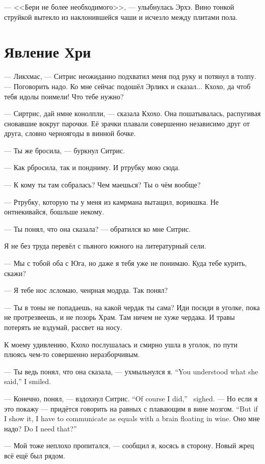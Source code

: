 --- <<Бери не более необходимого>>, --- улыбнулась Эрхэ.
Вино тонкой струйкой вытекло из наклонившейся чаши и исчезло между плитами пола.

\section{Явление Хри}

--- Ликхмас, --- Ситрис неожиданно подхватил меня под руку и потянул в толпу.
--- Поговорить надо.
Ко мне сейчас подошёл Эрликх и сказал...
Кхохо, да чтоб тебя идолы поимели!
Что тебе нужно?

--- Сиртрис, дай нмне конолпли, --- сказала Кхохо.
Она пошатывалась, распугивая сновавшие вокруг парочки.
Её зрачки плавали совершенно независимо друг от друга, словно черноягоды в винной бочке.

--- Ты же бросила, --- буркнул Ситрис.

--- Как рбросила, так и пондниму.
И ртрубку мою сюда.

--- К кому ты там собралась?
Чем маешься?
Ты о чём вообще?

--- Ртрубку, которую ты у меня из камрмана вытащил, ворикшка.
Не онтнекивайся, бошльше некому.

--- Ты понял, что она сказала? --- обратился ко мне Ситрис.

Я не без труда перевёл с пьяного южного на литературный сели.

--- Мы с тобой оба с Юга, но даже я тебя уже не понимаю.
Куда тебе курить, скажи?

--- Я тебе нос лсломаю, ченрная модрда.
Так понял?

--- Ты в тоны не попадаешь, на какой чердак ты сама?
Иди посиди в уголке, пока не протрезвеешь, и не позорь Храм.
Там ничем не хуже чердака.
И травы потерять не вздумай, рассвет на носу.

К моему удивлению, Кхохо послушалась и смирно ушла в уголок, по пути плюясь чем-то совершенно неразборчивым.

{--- Ты ведь понял, что она сказала, --- ухмыльнулся я.}
{``You understood what she said,'' I smiled.}

{--- Конечно, понял, --- вздохнул Ситрис.}
{``Of course I did,'' \Sitris\ sighed.}
{--- Но если я это покажу --- придётся говорить на равных с плавающим в вине мозгом.}
{``But if I show it, I have to communicate as equals with a brain floating in wine.}
{Оно мне надо?}
{Do I need that?''}

--- Мой тоже неплохо пропитался, --- сообщил я, косясь в сторону.
Новый жрец всё ещё был рядом.

